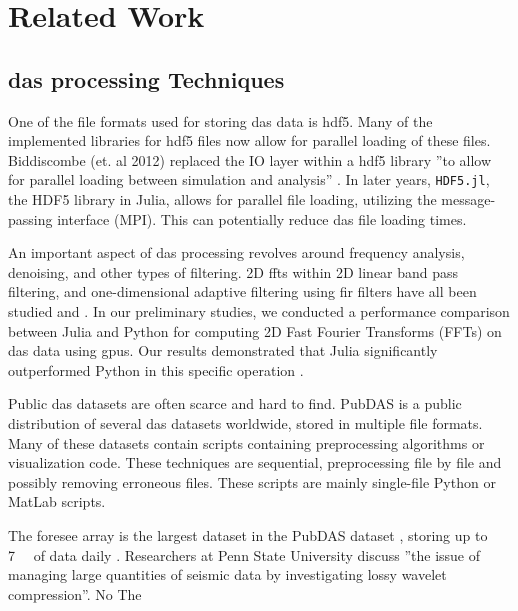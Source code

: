 \section{Related Work}
\label{back:relwork}


\subsection{\acrshort{das} processing Techniques}

One of the file formats used for storing \acrshort{das} data is \acrshort{hdf5}. Many of the implemented libraries for \acrshort{hdf5} files now allow for parallel loading of these files. Biddiscombe (et. al 2012) replaced the IO layer within a \acrshort{hdf5} library ''to allow for parallel loading between simulation and analysis'' \cite{biddiscombe2012parallel}. In later years, \texttt{HDF5.jl}, the HDF5 library in Julia, allows for parallel file loading, utilizing the message-passing interface (MPI). This can potentially reduce \acrshort{das} file loading times.

An important aspect of \acrshort{das} processing revolves around frequency analysis, denoising, and other types of filtering. 2D \acrfull{fft}s within 2D linear band pass filtering, and one-dimensional adaptive filtering using \acrfull{fir} filters have all been studied and \cite{daspreproc}. In our preliminary studies, we conducted a performance comparison between Julia and Python for computing 2D Fast Fourier Transforms (FFTs) on \acrshort{das} data using \acrshort{gpu}s. Our results demonstrated that Julia significantly outperformed Python in this specific operation \cite{projthesis}. 

Public \acrshort{das} datasets are often scarce and hard to find. PubDAS \cite{spica2023pubdas} is a public distribution of several \acrshort{das} datasets worldwide, stored in multiple file formats. Many of these datasets contain scripts containing preprocessing algorithms or visualization code. These techniques are sequential, preprocessing file by file and possibly removing erroneous files. These scripts are mainly single-file Python or MatLab scripts. 

The \acrfull{foresee} \cite{zhu2019penn} array is the largest dataset in the PubDAS dataset \cite{spica2023pubdas}, storing up to \qty{7}{\si{\tera\byte}} of data daily \cite{miller2023characterizing}. Researchers at Penn State University discuss ''the issue of managing large quantities of seismic data by investigating lossy wavelet compression''.  No \cite{zhu2023seismic}
The\cite{se-12-219-2021} 


